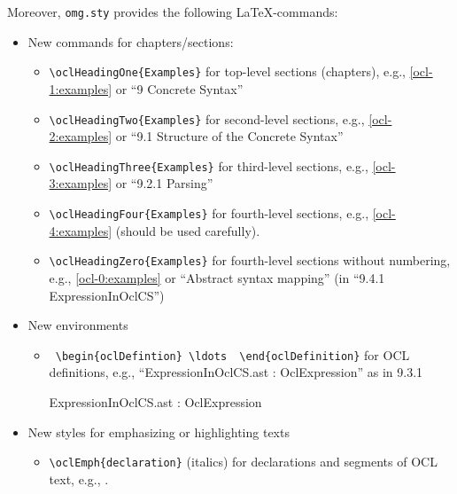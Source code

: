 \documentclass{omgrpt}
\begin{document}
Moreover,  \texttt{omg.sty} provides the following \LaTeX-commands:
\begin{itemize}
\item New commands for chapters/sections:
\begin{itemize}
\item \verb|\oclHeadingOne{Examples}| for top-level sections
    (chapters), e.g., \autoref{ocl-1:examples} or ``9 Concrete
    Syntax''%
\item \verb|\oclHeadingTwo{Examples}| for second-level sections,
    e.g., \autoref{ocl-2:examples}  or ``9.1 Structure of the Concrete
    Syntax''%
\item \verb|\oclHeadingThree{Examples}| for third-level sections,
    e.g., \autoref{ocl-3:examples} or ``9.2.1 Parsing''%
\item \verb|\oclHeadingFour{Examples}| for fourth-level sections,
    e.g., \autoref{ocl-4:examples} (should be used carefully).
\item \verb|\oclHeadingZero{Examples}| for fourth-level sections
    without numbering,
    e.g., \autoref{ocl-0:examples} or ``Abstract syntax mapping'' (in
    ``9.4.1 ExpressionInOclCS'')%
  \end{itemize}
\item New environments
  \begin{itemize}
  \item  \verb| \begin{oclDefintion} \ldots  \end{oclDefinition}| for
    OCL definitions, e.g., ``ExpressionInOclCS.ast : OclExpression''
    as in 9.3.1%
  \begin{oclDefinition}
    ExpressionInOclCS.ast : OclExpression
  \end{oclDefinition}
  \end{itemize}
\item New styles for emphasizing or highlighting texts
  \begin{itemize}
  \item  \verb|\oclEmph{declaration}| (italics) for declarations and segments of
OCL text, e.g., .
  \end{itemize}
\end{itemize}

\label{ocl-1:examples}
\lipsum[1]
\end{document}
